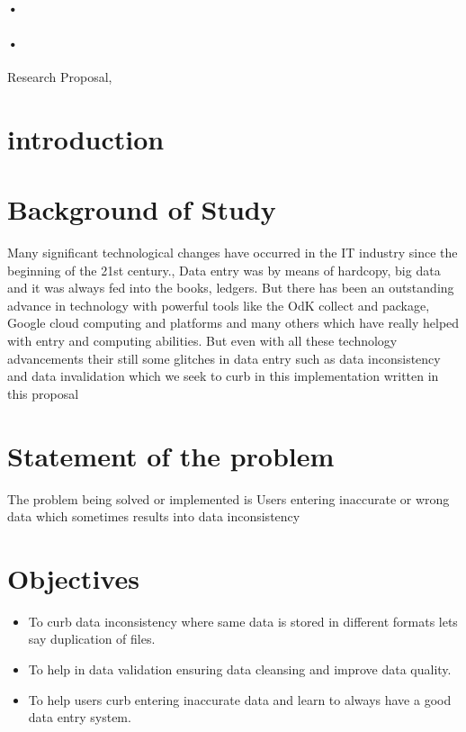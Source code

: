 \documentclass[12pt,]{article}
\begin{document}
\begin{titlepage}
\paragraph*{•}
\paragraph*{•}
  \begin{flushright}
  Research Proposal,\\
 
 \tableofcontents

  \end{flushright}
\date{\today}
\end{titlepage}

\newpage




\section{introduction}
\section{Background of Study}
Many significant technological changes have occurred in the IT industry since the beginning of the 21st century., Data entry was by means of hardcopy, big data and it was always fed into the books, ledgers. But there has been an outstanding advance in technology with powerful tools like the OdK collect and package, Google cloud computing and platforms and many others which have really helped with entry and computing abilities. But even with all these technology advancements their still some glitches in data entry such as data inconsistency and data invalidation which we seek to curb in this implementation written in this proposal
\section{Statement of the problem}
The problem being solved or implemented is Users entering inaccurate or wrong data which sometimes results into data inconsistency
\section{ Objectives}
\begin{itemize}
\item To curb data inconsistency where same data is stored in different formats lets say duplication of files.
\item To help in data validation ensuring data cleansing and improve data quality.
\item To help users curb entering inaccurate data and learn to always have a good data entry system.
\end{itemize}
\end{document}
